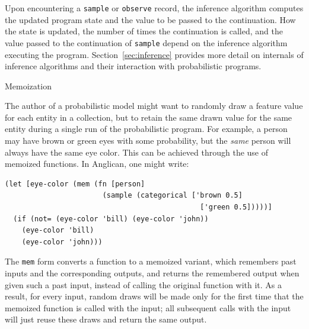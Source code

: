 \documentclass[sigconf]{acmart}
\begin{document}
Upon encountering a \texttt{sample} or \texttt{observe} record, the
inference algorithm computes the updated program state and the value
to be passed to the continuation.  How the state is updated, the
number of times the continuation is called, and the value passed to
the continuation of \texttt{sample} depend on the inference algorithm
executing the program.  Section~\ref{sec:inference} provides more
detail on internals of inference algorithms and their interaction
with probabilistic programs.

\iftoggle{full}{%
\smallskip
\begin{center}
*\qquad*\qquad*
\end{center}

In addition to \texttt{sample} and \texttt{observe}, there are a few other special
forms ---  \texttt{store}, \texttt{retrieve}, \texttt{mem} ---
which modify program state. These forms are translated into
expressions involving calls of functions from the
\texttt{anglican.state} namespace. The \texttt{mem} form, which
implements memoization, deserves a more detailed explanation.
}{%
}%

\iftoggle{full}{\subsubsection }{\subsection}{Memoization}
\label{sec:mem}

The author of a probabilistic model might want to 
randomly draw a feature value for each entity in a collection,
but to retain the same drawn
value for the same entity during a single run of the probabilistic
program. For example, a person may have brown or green eyes
with some probability, but the \textit{same} person will
always have the same eye color. This can be achieved
through the use of memoized functions. In Anglican, one
might write:
\begin{lstlisting}[style=default]
(let [eye-color (mem (fn [person]
                       (sample (categorical ['brown 0.5]
                                              ['green 0.5]))))]
  (if (not= (eye-color 'bill) (eye-color 'john))
    (eye-color 'bill)
    (eye-color 'john)))
\end{lstlisting}
The \texttt{mem} form converts a function to a memoized variant,
which remembers past inputs and the corresponding outputs, and 
returns the remembered output when given such a past input, 
instead of calling the original function with it. As a result,
for every input, random draws will be made only for the first time 
that the memoized function is called with the input; all subsequent
calls with the input will just reuse these draws and return the same output.
\end{document}

